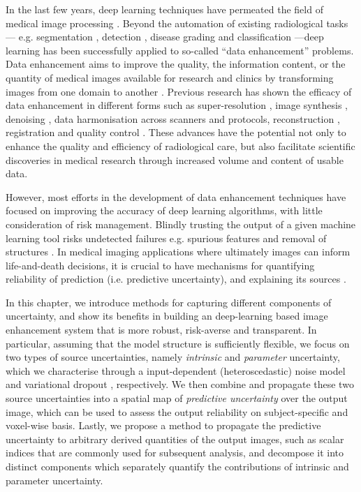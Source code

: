In the last few years, deep learning techniques have permeated the field of medical image processing \cite{shen2017deep,litjens2017survey}. Beyond the automation of existing radiological tasks--- e.g. segmentation \cite{kamnitsas2017efficient}, detection \cite{roth2014new}, disease grading and classification \cite{araujo2017classification}---deep learning has been successfully applied to so-called ``data enhancement'' problems. Data enhancement aims to improve the quality, the information content, or the quantity of medical images available for research and clinics by transforming images from one domain to another \cite{isola2017image}. Previous research has shown the efficacy of data enhancement in different forms such as super-resolution \cite{oktay2016multi,chen2018efficient,ravi2019adversarial}, image synthesis \cite{nie2016estimating,kang2017deep}, denoising \cite{benou2017ensemble,chen2017low}, data harmonisation \cite{karayumak2018harmonizing,tax2019cross} across scanners and protocols, reconstruction \cite{sun2016deep,jin2017deep,hammernik2018learning,schlemper2018deep,zhu2018image,yang2018dagan,yoon2019efficient}, registration \cite{sokooti2017nonrigid,balakrishnan2018unsupervised} and quality control \cite{wu2017fuiqa,esses2018automated}.  These advances have the potential not only to enhance the quality and efficiency of radiological care, but also facilitate scientific discoveries in medical research through increased volume and content of usable data. 

However,  most efforts in the development of data enhancement techniques have focused on improving the accuracy of deep learning algorithms, with little consideration of risk management. Blindly trusting the output of a given machine learning tool risks undetected failures e.g. spurious features and removal of structures \cite{cohen2018distribution}. In medical imaging applications where ultimately images can inform life-and-death decisions, it is crucial to have mechanisms for quantifying reliability of prediction (i.e. predictive uncertainty), and explaining its sources \cite{begoli2019need}.  


In this chapter, we introduce methods for capturing different components of uncertainty, and show its benefits in building an deep-learning based image enhancement system that is more robust, risk-averse and transparent. In particular, assuming that the model structure is sufficiently flexible, we focus on two types of source uncertainties, namely \textit{intrinsic} and \textit{parameter} uncertainty, which we characterise through a input-dependent (heteroscedastic) noise model \cite{nix1994estimating} and variational dropout \cite{kingma2015variational}, respectively. We then combine and propagate these two source uncertainties into a spatial map of \textit{predictive uncertainty} over the output image, which can be used to assess the output reliability on subject-specific and voxel-wise basis. Lastly, we propose a method to propagate the predictive uncertainty to arbitrary derived quantities of the output images, such as scalar indices that are commonly used for subsequent analysis, and decompose it into distinct components which separately quantify the contributions of intrinsic and parameter uncertainty. 

